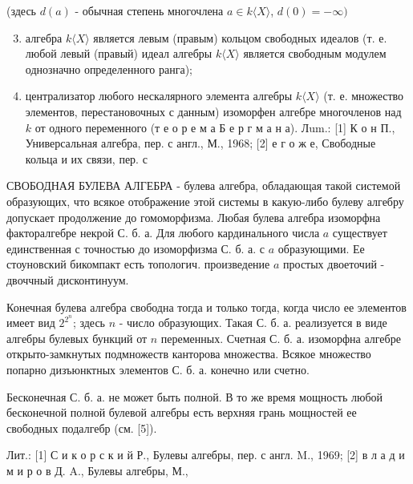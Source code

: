 \documentclass[10pt]{article}
\begin{document}
(здесь $d(a)$ - обычная степень многочлена $a \in k\langle X\rangle$, $d(0)=-\infty)$



\begin{enumerate}

  \setcounter{enumi}{2}

  \item алгебра $k\langle X\rangle$ является левым (правым) кольцом свободных идеалов (т. е. любой левый (правый) идеал алгебры $k\langle X\rangle$ является свободным модулем однозначно определенного ранга);



  \item централизатор любого нескалярного элемента алгебры $k\langle X\rangle$ (т. е. множество элементов, перестановочных с данным) изоморфен алгебре многочленов над $k$ от одного переменного (т е о р е м а Б е р г м а н а). Лum.: [1] К о н П., Универсальная алгебра, пер. с англ., М., 1968; [2] е г о ж е, Свободные кольца и их связи, пер. с



\end{enumerate}



СВОБОДНАЯ БУЛЕВА АЛГЕБРА - булева алгебра, обладающая такой системой образующих, что всякое отображение этой системы в какую-либо булеву алгебру допускает продолжение до гомоморфизма. Любая булева алгебра изоморфна факторалгебре некрой С. б. а. Для любого кардинального числа $a$ существует единственная с точностью до изоморфизма С. б. а. с $a$ образующими. Ее стоуновский бикомпакт есть топологич. произведение $a$ простых двоеточий - двоччный дисконтинуум.



Конечная булева алгебра свободна тогда и только тогда, когда число ее элементов имеет вид $2^{2^{n}}$; здесь $n$ - число образующих. Такая С. б. а. реализуется в виде алгебры булевых бункций от $n$ переменных. Счетная С. б. а. изоморфна алгебре открыто-замкнутых подмножеств канторова множества. Всякое множество попарно дизъюнктных элементов С. б. а. конечно или счетно.



Бесконечная С. б. а. не может быть полной. В то же время мощность любой бесконечной полной булевой алгебры есть верхняя грань мощностей ее свободных подалгебр (см. [5]).



Лит.: [1] С и к о р с к и й Р., Булевы алгебры, пер. с англ. M., 1969; [2] в л а д и м и р о в Д. A., Булевы алгебры, М.,
\end{document}
